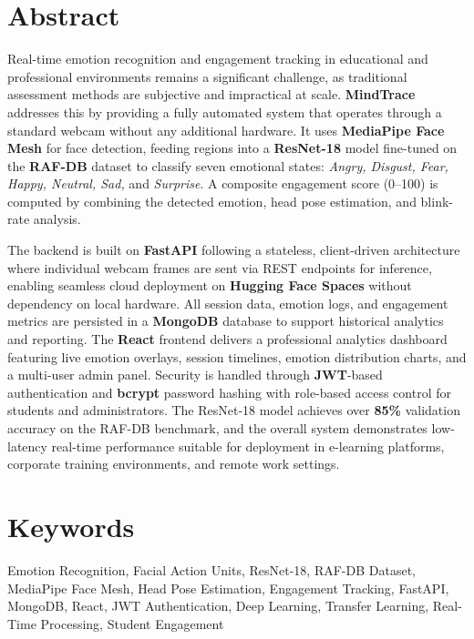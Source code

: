\chapter*{Abstract}
\thispagestyle{plain}

Real-time emotion recognition and engagement tracking in educational and professional environments remains a significant challenge, as traditional assessment methods are subjective and impractical at scale. \textbf{MindTrace} addresses this by providing a fully automated system that operates through a standard webcam without any additional hardware. It uses \textbf{MediaPipe Face Mesh} for face detection, feeding regions into a \textbf{ResNet-18} model fine-tuned on the \textbf{RAF-DB} dataset to classify seven emotional states: \textit{Angry, Disgust, Fear, Happy, Neutral, Sad,} and \textit{Surprise}. A composite engagement score (0--100) is computed by combining the detected emotion, head pose estimation, and blink-rate analysis.

The backend is built on \textbf{FastAPI} following a stateless, client-driven architecture where individual webcam frames are sent via REST endpoints for inference, enabling seamless cloud deployment on \textbf{Hugging Face Spaces} without dependency on local hardware. All session data, emotion logs, and engagement metrics are persisted in a \textbf{MongoDB} database to support historical analytics and reporting. The \textbf{React} frontend delivers a professional analytics dashboard featuring live emotion overlays, session timelines, emotion distribution charts, and a multi-user admin panel. Security is handled through \textbf{JWT}-based authentication and \textbf{bcrypt} password hashing with role-based access control for students and administrators. The ResNet-18 model achieves over \textbf{85\%} validation accuracy on the RAF-DB benchmark, and the overall system demonstrates low-latency real-time performance suitable for deployment in e-learning platforms, corporate training environments, and remote work settings.

\newpage
\chapter*{Keywords}
\thispagestyle{plain}

\noindent
Emotion Recognition, Facial Action Units, ResNet-18, RAF-DB Dataset,
MediaPipe Face Mesh, Head Pose Estimation, Engagement Tracking, FastAPI,
MongoDB, React, JWT Authentication, Deep Learning, Transfer Learning,
Real-Time Processing, Student Engagement
